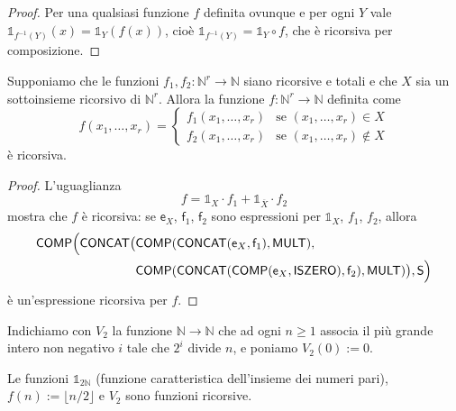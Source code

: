 \begin{proof}
Per una qualsiasi funzione $f$ definita ovunque e per ogni $Y$ vale $\mathbb 1_{f^{-1}(Y)}(x)=\mathbb 1_Y(f(x))$, cioè
$\mathbb 1_{f^{-1}(Y)}=\mathbb 1_Y\circ f$, che è ricorsiva per composizione.
\end{proof}

\begin{lemm}
Supponiamo che le funzioni $f_1,f_2\colon\mathbb N^r\to\mathbb N$ siano ricorsive e totali e che $X$ sia un sottoinsieme ricorsivo di $\mathbb N^r$.
Allora la funzione $f\colon\mathbb N^r\to\mathbb N$ definita come
\[
f(x_1,\dots,x_r)=\begin{cases}
f_1(x_1,\dots,x_r) & \text{se } (x_1,\dots,x_r)\in X\\
f_2(x_1,\dots,x_r) & \text{se } (x_1,\dots,x_r)\notin X
\end{cases}
\]
è ricorsiva.
\end{lemm}

\begin{proof}
L'uguaglianza
\[
f=\mathbb 1_X\cdot f_1+\mathbb 1_{\overline X}\cdot f_2
\]
mostra che $f$ è ricorsiva: se $\mathsf e_X$, $\mathsf f_1$, $\mathsf f_2$ sono espressioni per $\mathbb 1_X$, $f_1$, $f_2$, allora
\[
\begin{aligned}
\mathsf{COMP}\Bigl(\mathsf{CONCAT}\bigl(&\mathsf{COMP}(\mathsf{CONCAT}(\mathsf e_X,\mathsf f_1),\mathsf{MULT}),\\
&\mathsf{COMP}(\mathsf{CONCAT}(\mathsf{COMP}(\mathsf e_X,\mathsf{ISZERO}),\mathsf f_2),\mathsf{MULT})\bigr),\mathsf S\Bigr)
\end{aligned}
\]
è un'espressione ricorsiva per $f$.
\end{proof}

\begin{defi}
Indichiamo con $V_2$ la funzione $\mathbb N\to\mathbb N$ che ad ogni $n\ge1$ associa il più grande intero non negativo $i$ tale che $2^i$ divide $n$, e poniamo $V_2(0):=0$.
\end{defi}

\begin{prop}
Le funzioni $\mathbb 1_{2\mathbb N}$ (funzione caratteristica dell'insieme dei numeri pari), $f(n):=\lfloor n/2\rfloor$ e $V_2$ sono funzioni ricorsive.
\end{prop}


